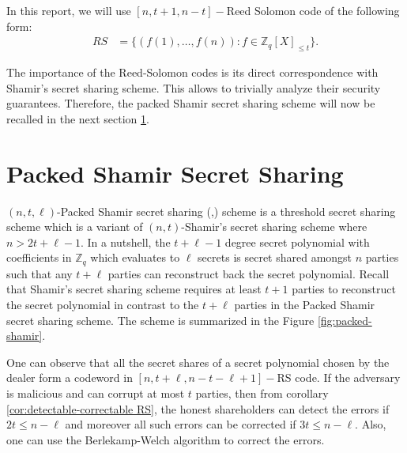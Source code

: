 In this report, we will use $[n, t+1, n-t]-$Reed Solomon code of the following form:
\begin{align}\label{eq:reed-solomon code-2}
  RS &= \{(f(1),\dots,f(n)) : f\in \mathbb{Z}_q[X]_{\leq t}\}.
\end{align}

The importance of the Reed-Solomon codes is its direct correspondence with Shamir's 
secret sharing scheme. This allows to trivially analyze their security guarantees. Therefore, the 
packed Shamir secret sharing scheme will now be recalled in the next section \ref{sec:packed-shamir}. 

\section{Packed Shamir Secret Sharing}
\label{sec:packed-shamir}
$(n,t,\ell)$-Packed Shamir secret sharing (\cite{10.1145/129712.129780},\cite{crypto-1984-905})
 scheme is a threshold secret sharing scheme which is a variant of $(n,t)$-Shamir's 
 secret sharing scheme \cite{10.1145/359168.359176} where $n>2t+\ell-1$. In a nutshell, the $t+\ell-1$ 
 degree secret polynomial with coefficients in $\mathbb{Z}_q$ which evaluates to $\ell$ 
 secrets is secret shared amongst $n$ parties such that any $t+\ell$ parties can 
 reconstruct back the secret polynomial. Recall that Shamir's secret sharing scheme 
 requires at least $t+1$ parties to reconstruct the secret polynomial in contrast to 
 the $t+\ell$ parties in the Packed Shamir secret sharing scheme. The scheme is
 summarized in the Figure \ref{fig:packed-shamir}.


One can observe that all the secret shares of a secret polynomial chosen by the dealer form a codeword in 
$[n,t+\ell,n-t-\ell+1]-$RS code. If the adversary is malicious and can corrupt at most $t$ parties, then from 
corollary \ref{cor:detectable-correctable RS}, the honest shareholders can detect the errors if 
$2t\leq n-\ell$ and moreover all such errors can be corrected if $3t\leq n-\ell$. Also, one can use 
the Berlekamp-Welch algorithm \cite{welch1986error} to correct the errors.\par

